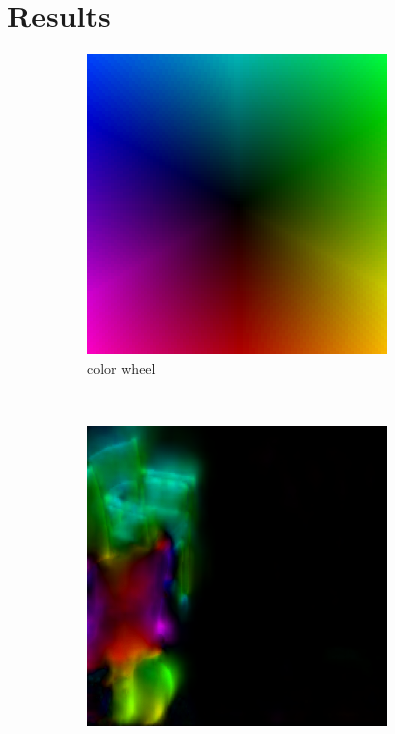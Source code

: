 
\section{Results}


\begin{figure}[H]

	\begin{subfigure}[t]{0.3\textwidth}
        \centering
        \includegraphics[width=\textwidth]{color_wheel}
        \caption{color wheel}
    \end{subfigure}
    ~
    \begin{subfigure}[t]{0.3\textwidth}
        \centering
		\includegraphics[width=\textwidth]{1-global-step57865}

\end{subfigure}
\end{figure}
